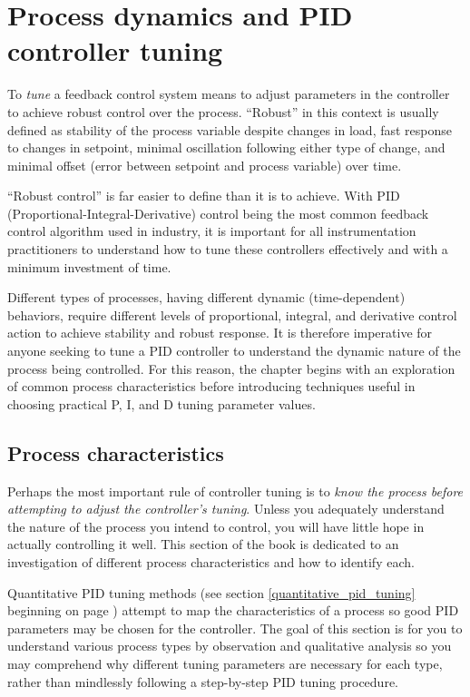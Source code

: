 
\chapter{Process dynamics and PID controller tuning}

To \textit{tune} a feedback control system means to adjust parameters in the controller to achieve robust control over the process.  ``Robust'' in this context is usually defined as stability of the process variable despite changes in load, fast response to changes in setpoint, minimal oscillation following either type of change, and minimal offset (error between setpoint and process variable) over time.

``Robust control'' is far easier to define than it is to achieve.  With PID (Proportional-Integral-Derivative) control being the most common feedback control algorithm used in industry, it is important for all instrumentation practitioners to understand how to tune these controllers effectively and with a minimum investment of time.

\vskip 10pt

Different types of processes, having different dynamic (time-dependent) behaviors, require different levels of proportional, integral, and derivative control action to achieve stability and robust response.  It is therefore imperative for anyone seeking to tune a PID controller to understand the dynamic nature of the process being controlled.  For this reason, the chapter begins with an exploration of common process characteristics before introducing techniques useful in choosing practical P, I, and D tuning parameter values.








\filbreak
\section{Process characteristics}

\label{process_characteristics}

Perhaps the most important rule of controller tuning is to \textit{know the process before attempting to adjust the controller's tuning}.  Unless you adequately understand the nature of the process you intend to control, you will have little hope in actually controlling it well.  This section of the book is dedicated to an investigation of different process characteristics and how to identify each.  

Quantitative PID tuning methods (see section \ref{quantitative_pid_tuning} beginning on page \pageref{quantitative_pid_tuning}) attempt to map the characteristics of a process so good PID parameters may be chosen for the controller.  The goal of this section is for you to understand various process types by observation and qualitative analysis so you may comprehend why different tuning parameters are necessary for each type, rather than mindlessly following a step-by-step PID tuning procedure.

